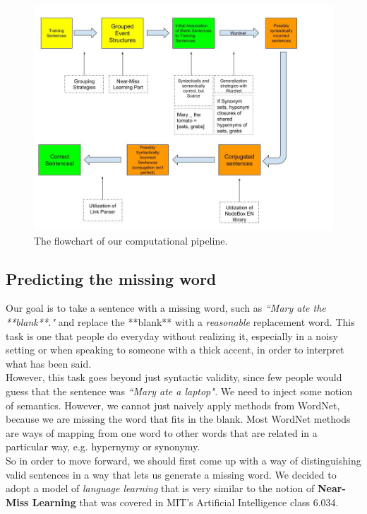 \documentclass{article}[12pt]
\theoremstyle{definition}
\begin{document}
\begin{figure}
  \includegraphics[width=\linewidth]{6_863_Pipeline.jpg}
  \caption{The flowchart of our computational pipeline.}
  \label{fig:boat1}
\end{figure}

\subsection{Predicting the missing word}

Our goal is to take a sentence with a missing word, such as \emph{``Mary ate the **blank**."} and replace the **blank** with a \emph{reasonable} replacement word. This task is one that people do everyday without realizing it, especially in a noisy setting or when speaking to someone with a thick accent, in order to interpret what has been said. \\

However, this task goes beyond just syntactic validity, since few people would guess that the sentence was \emph{``Mary ate a laptop".} We need to inject some notion of semantics. However, we cannot just naively apply methods from WordNet, because we are missing the word that fits in the blank. Most WordNet methods are ways of mapping from one word to other words that are related in a particular way, e.g. hypernymy or synonymy. \\

So in order to move forward, we should first come up with a way of distinguishing valid sentences in a way that lets us generate a missing word. We decided to adopt a model of \emph{language learning} that is very similar to the notion of \textbf{Near-Miss Learning} that was covered in MIT's Artificial Intelligence class 6.034. \\
\end{document}
